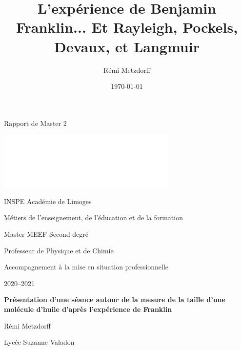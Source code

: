 \documentclass[12pt,a4paper]{article}
\title{L'expérience de Benjamin Franklin... Et Rayleigh, Pockels, Devaux, et Langmuir}
\author{Rémi Metzdorff}
\date{\today}
\newenvironment{header}
{%
	\addcontentsline{ldf}{figure}{0}%
	\begin{header_env}\qquad\Large\bf}
	{\end{header_env}}
\begin{document}

\begin{header}
\begin{minipage}{0.55\textwidth}
Rapport de Master 2
\end{minipage}
\begin{minipage}{0.38\textwidth}
\href{https://www.unilim.fr/}{\includegraphics[scale=1]{logo.png}}
\end{minipage}
\end{header}

\vspace{30pt}
\begin{spacing}{1.2}
{\bf
\begin{Large}
\noindent
\textcolor{gray_unilim}{INSPE Académie de Limoges}
\end{Large}

\begin{large}
\noindent
\textcolor{gray_unilim}{Métiers de l'enseignement, de l'éducation et de la formation}

\noindent
\textcolor{gray_unilim}{Master MEEF Second degré}

\noindent
\textcolor{gray_unilim}{Professeur de Physique et de Chimie}

\noindent
\textcolor{gray_unilim}{Accompagnement à la mise en situation professionnelle}

\end{large}
}

\vspace{20pt}

\noindent
\textcolor{gray_unilim}{2020--2021}

\vspace{40pt}
\begin{large}
\bf
\noindent
\textcolor{gray_unilim}{Présentation d'une séance autour de la mesure de la taille d'une molécule d'huile d'après l'expérience de Franklin}

\vspace{150pt}
\noindent
\textcolor{gray_unilim}{Rémi Metzdorff}

\noindent
\textcolor{gray_unilim}{Lycée Suzanne Valadon}
\end{large}
\end{spacing}
\end{document}
